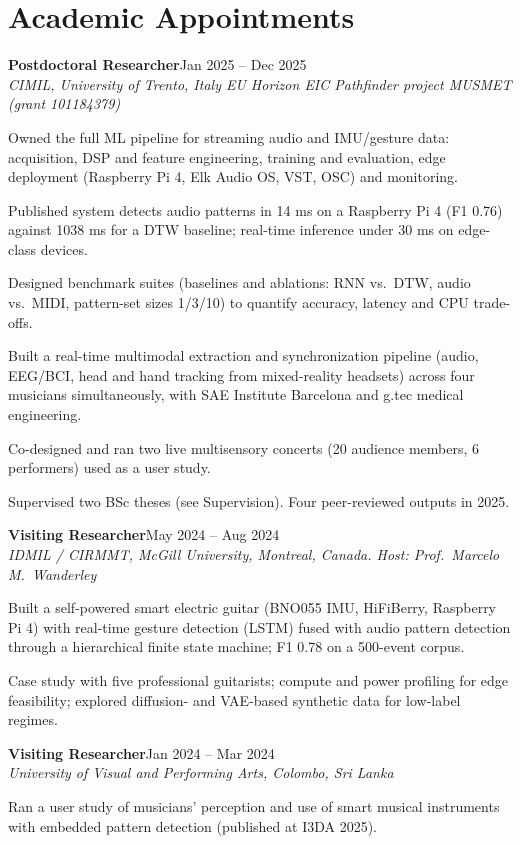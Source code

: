 \documentclass[11pt]{article}
\newcommand{\entry}[3]{%
  \par\noindent\textbf{#1}\hfill #2\\
  \noindent\textit{#3}\par\vspace{0.15em}}
\begin{document}
\section*{Academic Appointments}
\entry{Postdoctoral Researcher}{Jan 2025 -- Dec 2025}{CIMIL, University of Trento, Italy \textbar{} EU Horizon EIC Pathfinder project MUSMET (grant 101184379)}
\begin{cvlist}
  \item Owned the full ML pipeline for streaming audio and IMU/gesture data: acquisition, DSP and feature engineering, training and evaluation, edge deployment (Raspberry Pi 4, Elk Audio OS, VST, OSC) and monitoring.
  \item Published system detects audio patterns in 14 ms on a Raspberry Pi 4 (F1 0.76) against 1038 ms for a DTW baseline; real-time inference under 30 ms on edge-class devices.
  \item Designed benchmark suites (baselines and ablations: RNN vs.\ DTW, audio vs.\ MIDI, pattern-set sizes 1/3/10) to quantify accuracy, latency and CPU trade-offs.
  \item Built a real-time multimodal extraction and synchronization pipeline (audio, EEG/BCI, head and hand tracking from mixed-reality headsets) across four musicians simultaneously, with SAE Institute Barcelona and g.tec medical engineering.
  \item Co-designed and ran two live multisensory concerts (20 audience members, 6 performers) used as a user study.
  \item Supervised two BSc theses (see Supervision). Four peer-reviewed outputs in 2025.
\end{cvlist}
\entry{Visiting Researcher}{May 2024 -- Aug 2024}{IDMIL / CIRMMT, McGill University, Montreal, Canada. Host: Prof.\ Marcelo M.\ Wanderley}
\begin{cvlist}
  \item Built a self-powered smart electric guitar (BNO055 IMU, HiFiBerry, Raspberry Pi 4) with real-time gesture detection (LSTM) fused with audio pattern detection through a hierarchical finite state machine; F1 0.78 on a 500-event corpus.
  \item Case study with five professional guitarists; compute and power profiling for edge feasibility; explored diffusion- and VAE-based synthetic data for low-label regimes.
\end{cvlist}
\entry{Visiting Researcher}{Jan 2024 -- Mar 2024}{University of Visual and Performing Arts, Colombo, Sri Lanka}
\begin{cvlist}
  \item Ran a user study of musicians' perception and use of smart musical instruments with embedded pattern detection (published at I3DA 2025).
\end{cvlist}
\end{document}
